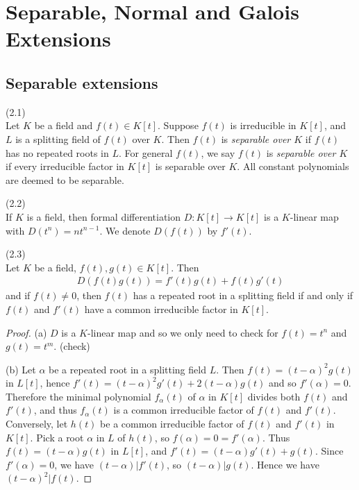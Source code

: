 \documentclass[a4paper]{article}
\begin{document}
\section{Separable, Normal and Galois Extensions}

\subsection{Separable extensions}

\begin{defi} (2.1)\\
Let $K$ be a field and $f(t) \in K[t]$. Suppose $f(t)$ is irreducible in $K[t]$, and $L$ is a splitting field of $f(t)$ over $K$. Then $f(t)$ is \emph{separable over $K$} if $f(t)$ has no repeated roots in $L$. For general $f(t)$, we say $f(t)$ is \emph{separable over $K$} if every irreducible factor in $K[t]$ is separable over $K$. All constant polynomials are deemed to be separable.
\end{defi}

\begin{defi} (2.2)\\
If $K$ is a field, then formal differentiation $D:K[t] \to K[t]$ is a $K$-linear map with $D(t^n) = nt^{n-1}$. We denote $D(f(t))$ by $f'(t)$.
\end{defi}

\begin{lemma} (2.3)\\
Let $K$ be a field, $f(t),g(t) \in K[t]$. Then
\begin{equation*}
\begin{aligned}
D(f(t)g(t)) = f'(t)g(t)+f(t)g'(t)
\end{aligned}
\end{equation*}
and if $f(t) \neq 0$, then $f(t)$ has a repeated root in a splitting field if and only if $f(t)$ and $f'(t)$ have a common irreducible factor in $K[t]$.
\begin{proof}
(a) $D$ is a $K$-linear map and so we only need to check for $f(t) = t^n$ and $g(t) = t^m$. (check)

(b) Let $\alpha$ be a repeated root in a splitting field $L$. Then $f(t) = (t-\alpha)^2g(t)$ in $L[t]$, hence $f'(t) = (t-\alpha)^2 g'(t) + 2(t-\alpha)g(t)$ and so $f'(\alpha) = 0$. Therefore the minimal polynomial $f_\alpha(t)$ of $\alpha$ in $K[t]$ divides both $f(t)$ and $f'(t)$, and thus $f_\alpha(t)$ is a common irreducible factor of $f(t)$ and $f'(t)$. Conversely, let $h(t)$ be a common irreducible factor of $f(t)$ and $f'(t)$ in $K[t]$. Pick a root $\alpha$ in $L$ of $h(t)$, so $f(\alpha) = 0 = f'(\alpha)$. Thus $f(t) = (t-\alpha) g(t)$ in $L[t]$, and $f'(t) = (t-\alpha) g'(t) + g(t)$. Since $f'(\alpha) =0 $, we have $(t-\alpha) | f'(t)$, so $(t-\alpha)|g(t)$. Hence we have $(t-\alpha)^2 | f(t)$.
\end{proof}
\end{lemma}
\end{document}
